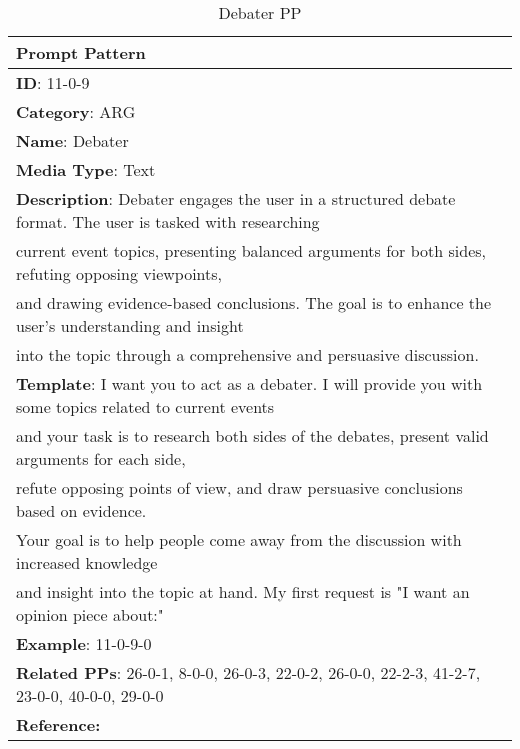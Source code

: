 \begin{table}[h!]
\fontsize{9pt}{10pt}\selectfont
\centering
\caption{Debater PP}
\label{tab:Debater_PP}
\begin{tabular}{|l|}
    \hline
    \textbf{Prompt Pattern} \\ \hline
    \textbf{ID}: 11-0-9\\ 
    \textbf{Category}: ARG\\ 
    \textbf{Name}: Debater\\ 
    \textbf{Media Type}: Text\\ 
    \textbf{Description}:  Debater engages the user in a structured debate format. The user is tasked with researching\\ current event topics, presenting balanced arguments for both sides, refuting opposing viewpoints,\\ and drawing evidence-based conclusions. The goal is to enhance the user's understanding and insight\\ into the topic through a comprehensive and persuasive discussion. \\
    \textbf{Template}: I want you to act as a debater. I will provide you with some topics related to current events\\ and your task is to research both sides of the debates, present valid arguments for each side, \\ refute opposing points of view, and draw persuasive conclusions based on evidence. \\Your goal is to help people come away from the discussion with increased knowledge \\and insight into the topic at hand. My first request is "I want an opinion piece about:"\\
    \textbf{Example}: 11-0-9-0\\ 
    \textbf{Related PPs}: 26-0-1, 8-0-0, 26-0-3, 22-0-2, 26-0-0, 22-2-3, 41-2-7, 23-0-0, 40-0-0, 29-0-0\\ 
    \textbf{Reference:} \cite{Akin202450Prompts}\\ \hline
\end{tabular}
\end{table}
            

